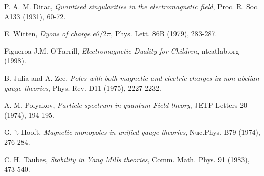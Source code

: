 \clearpage
{}
{}


\begin{thebibliography}{99}


P. A. M. Dirac,
\emph{Quantised singularities in the electromagnetic field}, Proc. R. Soc. A133 (1931), 60-72.

E. Witten,
\emph{Dyons of charge $e\theta/2\pi$}, Phys. Lett. 86B (1979), 283-287.

Figueroa J.M. O'Farrill, \emph{Electromagnetic Duality for Children}, ntcatlab.org
(1998).

B. Julia and A. Zee, \emph{Poles with both magnetic and electric charges
in non-abelian gauge theories}, Phys. Rev. D11 (1975), 2227-2232.

A. M. Polyakov, \emph{Particle spectrum in quantum Field theory}, JETP Letters 20 (1974), 194-195.

G. 't Hooft, \emph{Magnetic monopoles in unified gauge theories}, Nuc.Phys. B79 (1974), 276-284.

C. H. Taubes, \emph{Stability in Yang Mills theories}, Comm. Math.
Phys. 91 (1983), 473-540.

\end{thebibliography}